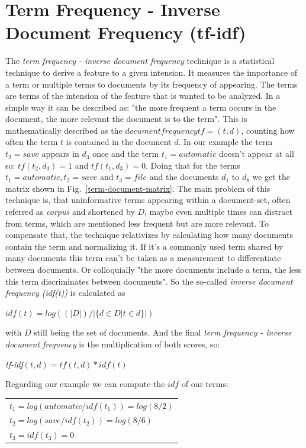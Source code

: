 \section{Term Frequency - Inverse Document Frequency (tf-idf)}
\label{ch:tf-idf}
The \emph{term frequency - inverse document frequency} technique is a statistical technique to derive a feature to a given intension. It measures the importance of a term or multiple terms to documents by its frequency of appearing. The terms are terms of the intension of the feature that is wanted to be analyzed. In a simple way it can be described as: "the more frequent a term occurs in the document, the more relevant the document is to the term". \newline
This is mathematically described as the $document frequency tf=(t,d)$, counting how often the term $t$ is contained in the document $d$.
In our example the term $t_2 = save$ appears in $d_3$ once and the term $t_1 = automatic$ doesn't appear at all so: $tf(t_2,d_3) = 1$ and $tf(t_1,d_3)=0$. \newline
Doing that for the terms $t_1 = automatic, t_2 = save$ and $t_3 = file$ and the documents $d_1$ to $d_8$ we get the matrix shown in Fig.~\ref{term-document-matrix}.
The main problem of this technique is, that uninformative terms appearing within a document-set, often referred as \emph{corpus} and shortened by $D$, maybe even multiple times can distract from terms, which are mentioned less frequent but are more relevant. To compensate that, the technique relativizes by calculating how many documents contain the term and normalizing it. If it's a commonly used term shared by many documents this term can't be taken as a measurement to differentiate between documents. Or colloquially "the more documents include a term, the less this term discriminates between documents". \newline
So the so-called \emph{inverse document frequency (idf(t))} is calculated as
\begin{center} $idf(t) = log((|D|)/|\{ d \in D | t \in d \}|)$  \end{center}
with $D$ still being the set of documents. And the final \emph{term frequency - inverse document frequency} is the multiplication of both scores, so:
\begin{center} \emph{tf-idf}$(t,d) = tf(t,d) * idf(t)$\end{center}
Regarding our example we can compute the $idf$ of our terms:

\begin{table}[h]
  \centering
  \begin{tabular}{l}
    $t_1 = log(automatic / idf(t_1)) = log(8/2)$  \\
    $t_2 = log(save / idf(t_2))=log(8/6)$ \\
    $t_3 = idf(t_3)=0$ 
 \end{tabular}
\end{table}

